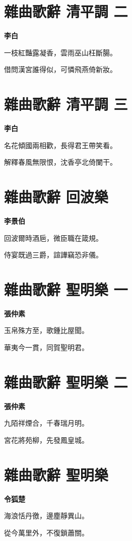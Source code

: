 \documentclass[12pt,a4paper]{ctexbook}
\begin{document}
\section{雜曲歌辭 清平調 二}
\textbf{李白}\par\vspace{0.5em}
一枝紅豔露凝香，雲雨巫山枉斷腸。\par
借問漢宮誰得似，可憐飛燕倚新妝。\par

\section{雜曲歌辭 清平調 三}
\textbf{李白}\par\vspace{0.5em}
名花傾國兩相歡，長得君王帶笑看。\par
解釋春風無限恨，沈香亭北倚闌干。\par

\section{雜曲歌辭 回波樂}
\textbf{李景伯}\par\vspace{0.5em}
回波爾時酒巵，微臣職在箴規。\par
侍宴既過三爵，諠譁竊恐非儀。\par

\section{雜曲歌辭 聖明樂 一}
\textbf{張仲素}\par\vspace{0.5em}
玉帛殊方至，歌鍾比屋聞。\par
華夷今一貫，同賀聖明君。\par

\section{雜曲歌辭 聖明樂 二}
\textbf{張仲素}\par\vspace{0.5em}
九陌祥煙合，千春瑞月明。\par
宮花將苑柳，先發鳳皇城。\par

\section{雜曲歌辭 聖明樂}
\textbf{令狐楚}\par\vspace{0.5em}
海浪恬丹徼，邊塵靜異山。\par
從今萬里外，不復鎖蕭關。\par
\end{document}
